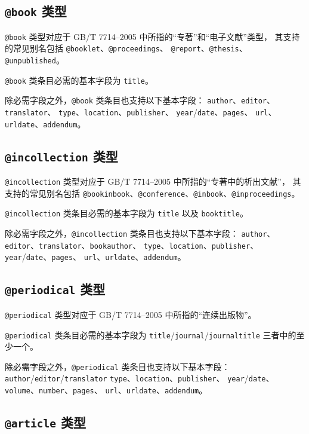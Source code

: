 \documentclass[UTF8, fancyhdr, hyperref]{ctexart}
\begin{document}
\subsection{\texttt{@book} 类型}

\verb|@book| 类型对应于 GB/T 7714--2005 中所指的“专著”和“电子文献”类型，
其支持的常见别名包括 \verb|@booklet|、\verb|@proceedings|、
\verb|@report|、\verb|@thesis|、\verb|@unpublished|。

\verb|@book| 类条目必需的基本字段为 \verb|title|。

除必需字段之外，\verb|@book| 类条目也支持以下基本字段：
\verb|author|、\verb|editor|、\verb|translator|、
\verb|type|、\verb|location|、\verb|publisher|、
\verb|year|/\verb|date|、\verb|pages|、
\verb|url|、\verb|urldate|、\verb|addendum|。

\subsection{\texttt{@incollection} 类型}

\verb|@incollection| 类型对应于 GB/T 7714--2005 中所指的“专著中的析出文献”，
其支持的常见别名包括
\verb|@bookinbook|、\verb|@conference|、\verb|@inbook|、\verb|@inproceedings|。

\verb|@incollection| 类条目必需的基本字段为 \verb|title| 以及 \verb|booktitle|。

除必需字段之外，\verb|@incollection| 类条目也支持以下基本字段：
\verb|author|、\verb|editor|、\verb|translator|、\verb|bookauthor|、
\verb|type|、\verb|location|、\verb|publisher|、
\verb|year|/\verb|date|、\verb|pages|、
\verb|url|、\verb|urldate|、\verb|addendum|。

\subsection{\texttt{@periodical} 类型}

\verb|@periodical| 类型对应于 GB/T 7714--2005 中所指的“连续出版物”。

\verb|@periodical| 类条目必需的基本字段为
\verb|title|/\verb|journal|/\verb|journaltitle| 三者中的至少一个。

除必需字段之外，\verb|@periodical| 类条目也支持以下基本字段：
\verb|author|/\verb|editor|/\verb|translator| 
\verb|type|、\verb|location|、\verb|publisher|、
\verb|year|/\verb|date|、\verb|volume|、\verb|number|、\verb|pages|、
\verb|url|、\verb|urldate|、\verb|addendum|。

\subsection{\texttt{@article} 类型}
\end{document}
